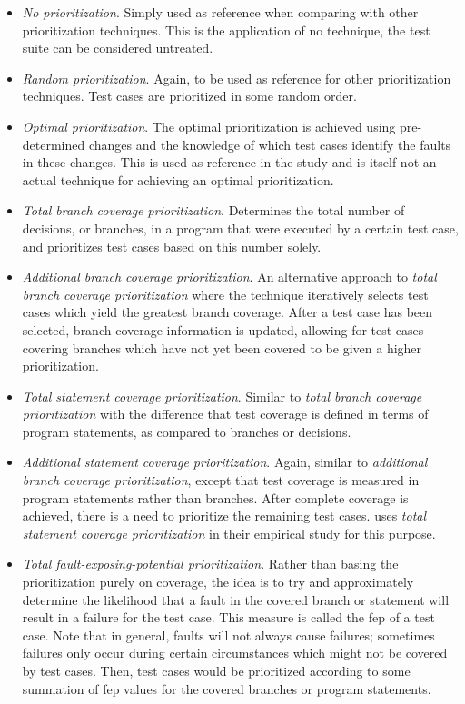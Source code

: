 \documentclass[a4paper,english,12pt]{report}
\begin{document}
\begin{itemize}
  \item\textit{No prioritization}. Simply used as reference when comparing with other prioritization techniques. This is the application of no technique, the test suite can be considered untreated.
  \item\textit{Random prioritization}. Again, to be used as reference for other prioritization techniques. Test cases are prioritized in some random order.
  \item\textit{Optimal prioritization}. The optimal prioritization is achieved using pre-determined changes and the knowledge of which test cases identify the faults in these changes. This is used as reference in the study and is itself not an actual technique for achieving an optimal prioritization.
  \item\textit{Total branch coverage prioritization}. Determines the total number of decisions, or branches, in a program that were executed by a certain test case, and prioritizes test cases based on this number solely.
  \item\textit{Additional branch coverage prioritization}. An alternative approach to \textit{total branch coverage prioritization} where the technique iteratively selects test cases which yield the greatest branch coverage. After a test case has been selected, branch coverage information is updated, allowing for test cases covering branches which have not yet been covered to be given a higher prioritization.
  \item\textit{Total statement coverage prioritization}. Similar to \textit{total branch coverage prioritization} with the difference that test coverage is defined in terms of program statements, as compared to branches or decisions.
  \item\textit{Additional statement coverage prioritization}. Again, similar to \textit{additional branch coverage prioritization}, except that test coverage is measured in program statements rather than branches. After complete coverage is achieved, there is a need to prioritize the remaining test cases. \citeauthor{rothermel1999testcase} uses \textit{total statement coverage prioritization} in their empirical study for this purpose.
  \item\textit{Total fault-exposing-potential prioritization}. Rather than basing the prioritization purely on coverage, the idea is to try and approximately determine the likelihood that a fault in the covered branch or statement will result in a failure for the test case. This measure is called the \gls{fep} of a test case. Note that in general, faults will not always cause failures; sometimes failures only occur during certain circumstances which might not be covered by test cases. Then, test cases would be prioritized according to some summation of \gls{fep} values for the covered branches or program statements.

\end{itemize}
\end{document}
